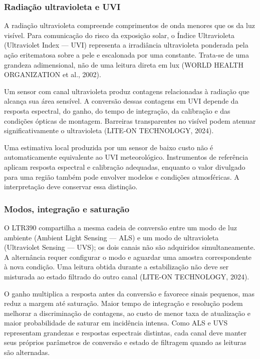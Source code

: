 \documentclass[a4paper,12pt]{article}
\begin{document}
\subsubsection{Radia\c{c}\~ao ultravioleta e UVI}


A radia\c{c}\~ao ultravioleta compreende comprimentos de onda menores que os da luz vis\'ivel. Para comunica\c{c}\~ao do risco da exposi\c{c}\~ao solar, o \'Indice Ultravioleta (Ultraviolet Index --- UVI) representa a irradi\^ancia ultravioleta ponderada pela a\c{c}\~ao eritematosa sobre a pele e escalonada por uma constante. Trata-se de uma grandeza adimensional, n\~ao de uma leitura direta em lux (WORLD HEALTH ORGANIZATION et al., 2002).


Um sensor com canal ultravioleta produz contagens relacionadas \`a radia\c{c}\~ao que alcan\c{c}a sua \'area sens\'ivel. A convers\~ao dessas contagens em UVI depende da resposta espectral, do ganho, do tempo de integra\c{c}\~ao, da calibra\c{c}\~ao e das condi\c{c}\~oes \'opticas de montagem. Barreiras transparentes no vis\'ivel podem atenuar significativamente o ultravioleta (LITE-ON TECHNOLOGY, 2024).


Uma estimativa local produzida por um sensor de baixo custo n\~ao \'e automaticamente equivalente ao UVI meteorol\'ogico. Instrumentos de refer\^encia aplicam resposta espectral e calibra\c{c}\~ao adequadas, enquanto o valor divulgado para uma regi\~ao tamb\'em pode envolver modelos e condi\c{c}\~oes atmosf\'ericas. A interpreta\c{c}\~ao deve conservar essa distin\c{c}\~ao.


\subsubsection{Modos, integra\c{c}\~ao e satura\c{c}\~ao}


O LTR390 compartilha a mesma cadeia de convers\~ao entre um modo de luz ambiente (Ambient Light Sensing --- ALS) e um modo de ultravioleta (Ultraviolet Sensing --- UVS); os dois canais n\~ao s\~ao adquiridos simultaneamente. A altern\^ancia requer configurar o modo e aguardar uma amostra correspondente \`a nova condi\c{c}\~ao. Uma leitura obtida durante a estabiliza\c{c}\~ao n\~ao deve ser misturada ao estado filtrado do outro canal (LITE-ON TECHNOLOGY, 2024).


O ganho multiplica a resposta antes da convers\~ao e favorece sinais pequenos, mas reduz a margem at\'e satura\c{c}\~ao. Maior tempo de integra\c{c}\~ao e resolu\c{c}\~ao podem melhorar a discrimina\c{c}\~ao de contagens, ao custo de menor taxa de atualiza\c{c}\~ao e maior probabilidade de saturar em incid\^encia intensa. Como ALS e UVS representam grandezas e respostas espectrais distintas, cada canal deve manter seus pr\'oprios par\^ametros de convers\~ao e estado de filtragem quando as leituras s\~ao alternadas.
\end{document}
